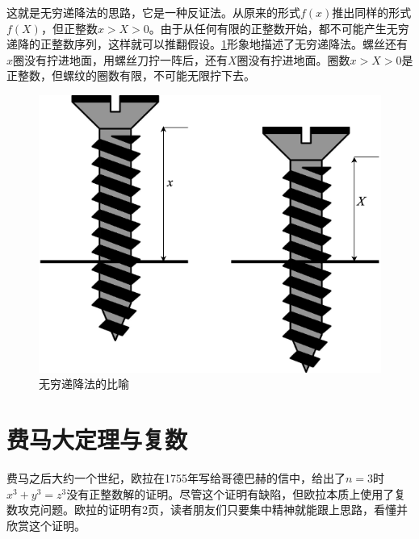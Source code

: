 \documentclass[b5paper]{ctexart}
\begin{document}
这就是无穷递降法的思路，它是一种反证法。从原来的形式$f(x)$推出同样的形式$f(X)$，但正整数$x > X > 0$。由于从任何有限的正整数开始，都不可能产生无穷递降的正整数序列，这样就可以推翻假设。\cref{fig:infinite-descent}形象地描述了无穷递降法。螺丝还有$x$圈没有拧进地面，用螺丝刀拧一阵后，还有$X$圈没有拧进地面。圈数$x > X > 0$是正整数，但螺纹的圈数有限，不可能无限拧下去。

\begin{figure}[htbp]
 \centering
 \includegraphics[scale=0.3]{img/infinite-descent}
 \caption{无穷递降法的比喻}
 \label{fig:infinite-descent}
\end{figure}

\section{费马大定理与复数}

费马之后大约一个世纪，欧拉在1755年写给哥德巴赫的信中，给出了$n = 3$时$x^3 + y^3 = z^3$没有正整数解的证明。尽管这个证明有缺陷，但欧拉本质上使用了复数攻克问题。欧拉的证明有2页，读者朋友们只要集中精神就能跟上思路，看懂并欣赏这个证明。
\end{document}
